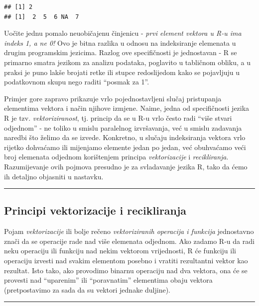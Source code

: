 \documentclass[]{book}
\theoremstyle{definition}
\theoremstyle{definition}
\theoremstyle{definition}
\theoremstyle{remark}
\begin{document}
\begin{verbatim}
## [1] 2
## [1]  2  5  6 NA  7
\end{verbatim}

Uočite jednu pomalo neuobičajenu činjenicu - \emph{prvi element vektora
u R-u ima indeks 1, a ne 0!} Ovo je bitna razlika u odnosu na
indeksiranje elemenata u drugim programskim jezicima. Razlog ove
specifičnosti je jednostavan - R se primarno smatra jezikom za analizu
podataka, poglavito u tabličnom obliku, a u praksi je puno lakše brojati
retke ili stupce redoslijedom kako se pojavljuju u podatkovnom skupu
nego raditi ``posmak za 1''.

Primjer gore zapravo prikazuje vrlo pojednostavljeni slučaj pristupanja
elementima vektora i način njihove izmjene. Naime, jedna od
specifičnosti jezika R je tzv. \emph{vektoriziranost}, tj. princip da se
u R-u vrlo često radi ``više stvari odjednom'' - ne toliko u smislu
paralelnog izvršavanja, već u smislu zadavanja naredbi što želimo da se
izvede. Konkretno, u slučaju indeksiranja vektora vrlo rijetko dohvaćamo
ili mijenjamo elemente jedan po jedan, već obuhvaćamo veći broj
elemenata odjednom korištenjem principa \emph{vektorizacije} i
\emph{recikliranja}. Razumijevanje ovih pojmova presudno je za
svladavanje jezika R, tako da ćemo ih detaljno objasniti u nastavku.

\begin{center}\rule{0.5\linewidth}{\linethickness}\end{center}

\subsection{Principi vektorizacije i
recikliranja}\label{principi-vektorizacije-i-recikliranja}

Pojam \emph{vektorizacije} ili bolje rečeno \emph{vektoriziranih
operacija i funkcija} jednostavno znači da se operacije rade nad više
elemenata odjednom. Ako zadamo R-u da radi neku operaciju ili funkciju
nad nekim vektorom vrijednosti, R će funkciju ili operaciju izvesti nad
svakim elementom posebno i vratiti rezultantni vektor kao rezultat. Isto
tako, ako provodimo binarnu operaciju nad dva vektora, ona će se
provesti nad ``uparenim'' ili ``poravnatim'' elementima obaju vektora
(pretpostavimo za sada da su vektori jednake duljine).

\begin{center}\rule{0.5\linewidth}{\linethickness}\end{center}
\end{document}
